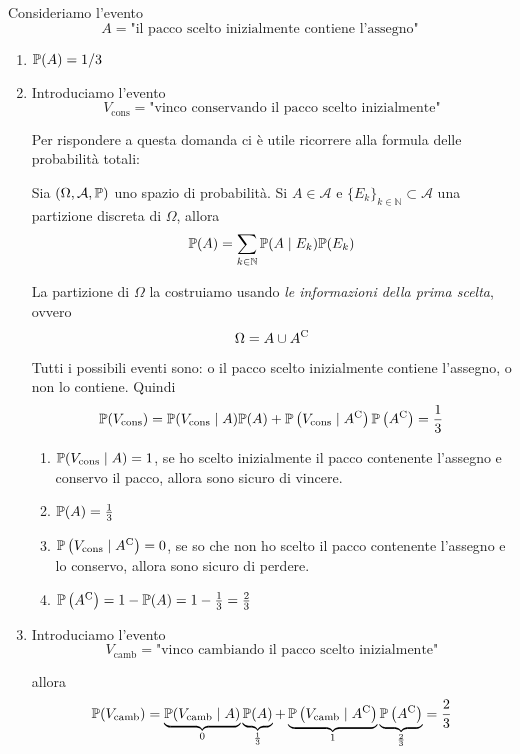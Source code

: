 Consideriamo l'evento
\begin{equation*}
A=\text{"il pacco scelto inizialmente contiene l'assegno"}
\end{equation*}
\begin{enumerate}
\item $\mathbb{P}( A) =1/3$
\item Introduciamo l'evento
\begin{equation*}
V_{\text{cons}} =\text{"vinco conservando il pacco scelto inizialmente"}
\end{equation*}

Per rispondere a questa domanda ci è utile ricorrere alla formula delle probabilità totali:\begin{theorem}
Sia $( \Omega ,\mathcal{A} ,\mathbb{P})$ uno spazio di probabilità. Si $A\in \mathcal{A}$ e $\{E_{k}\}_{k\in \mathbb{N}} \subset \mathcal{A}$ una partizione discreta di $\Omega $, allora
\begin{equation*}
\mathbb{P}( A) =\sum\limits _{k\in \mathbb{N}}\mathbb{P}( A\mid E_{k})\mathbb{P}( E_{k})
\end{equation*}
\end{theorem}

La partizione di $\Omega $ la costruiamo usando \textit{le informazioni della prima scelta}, ovvero
\begin{equation*}
\Omega =A\cup A^{\mathrm{C}}
\end{equation*}

Tutti i possibili eventi sono: o il pacco scelto inizialmente contiene l'assegno, o non lo contiene. Quindi
\begin{equation*}
\mathbb{P}( V_{\text{cons}}) =\mathbb{P}( V_{\text{cons}} \mid A)\mathbb{P}( A) +\mathbb{P}\left( V_{\text{cons}} \mid A^{\mathrm{C}}\right)\mathbb{P}\left( A^{\mathrm{C}}\right) =\frac{1}{3}
\end{equation*}
\begin{enumerate}
\item $\mathbb{P}( V_{\text{cons}} \mid A) =1$, se ho scelto inizialmente il pacco contenente l'assegno e conservo il pacco, allora sono sicuro di vincere.
\item $\mathbb{P}( A) =\frac{1}{3}$
\item $\mathbb{P}\left( V_{\text{cons}} \mid A^{\mathrm{C}}\right) =0$, se so che non ho scelto il pacco contenente l'assegno e lo conservo, allora sono sicuro di perdere.
\item $\mathbb{P}\left( A^{\mathrm{C}}\right) =1-\mathbb{P}( A) =1-\frac{1}{3} =\frac{2}{3}$
\end{enumerate}
\item Introduciamo l'evento
\begin{equation*}
V_{\text{camb}} =\text{"vinco cambiando il pacco scelto inizialmente"}
\end{equation*}

allora
\begin{equation*}
\mathbb{P}( V_{\text{camb}}) =\underbrace{\mathbb{P}( V_{\text{camb}} \mid A)}_{0}\underbrace{\mathbb{P}( A)}_{\frac{1}{3}} +\underbrace{\mathbb{P}\left( V_{\text{camb}} \mid A^{\mathrm{C}}\right)}_{1}\underbrace{\mathbb{P}\left( A^{\mathrm{C}}\right)}_{\frac{2}{3}} =\frac{2}{3}
\end{equation*}
\end{enumerate}

